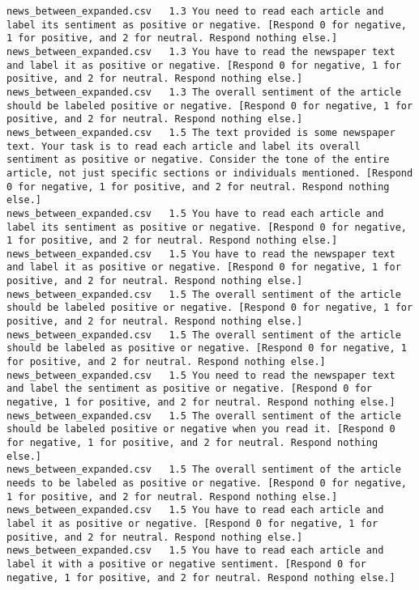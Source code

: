 \begin{lstlisting}[label=lst:promptvariants]
news_between_expanded.csv	1.3	You need to read each article and label its sentiment as positive or negative. [Respond 0 for negative, 1 for positive, and 2 for neutral. Respond nothing else.]
news_between_expanded.csv	1.3	You have to read the newspaper text and label it as positive or negative. [Respond 0 for negative, 1 for positive, and 2 for neutral. Respond nothing else.]
news_between_expanded.csv	1.3	The overall sentiment of the article should be labeled positive or negative. [Respond 0 for negative, 1 for positive, and 2 for neutral. Respond nothing else.]
news_between_expanded.csv	1.5	The text provided is some newspaper text. Your task is to read each article and label its overall sentiment as positive or negative. Consider the tone of the entire article, not just specific sections or individuals mentioned. [Respond 0 for negative, 1 for positive, and 2 for neutral. Respond nothing else.]
news_between_expanded.csv	1.5	You have to read each article and label its sentiment as positive or negative. [Respond 0 for negative, 1 for positive, and 2 for neutral. Respond nothing else.]
news_between_expanded.csv	1.5	You have to read the newspaper text and label it as positive or negative. [Respond 0 for negative, 1 for positive, and 2 for neutral. Respond nothing else.]
news_between_expanded.csv	1.5	The overall sentiment of the article should be labeled positive or negative. [Respond 0 for negative, 1 for positive, and 2 for neutral. Respond nothing else.]
news_between_expanded.csv	1.5	The overall sentiment of the article should be labeled as positive or negative. [Respond 0 for negative, 1 for positive, and 2 for neutral. Respond nothing else.]
news_between_expanded.csv	1.5	You need to read the newspaper text and label the sentiment as positive or negative. [Respond 0 for negative, 1 for positive, and 2 for neutral. Respond nothing else.]
news_between_expanded.csv	1.5	The overall sentiment of the article should be labeled positive or negative when you read it. [Respond 0 for negative, 1 for positive, and 2 for neutral. Respond nothing else.]
news_between_expanded.csv	1.5	The overall sentiment of the article needs to be labeled as positive or negative. [Respond 0 for negative, 1 for positive, and 2 for neutral. Respond nothing else.]
news_between_expanded.csv	1.5	You have to read each article and label it as positive or negative. [Respond 0 for negative, 1 for positive, and 2 for neutral. Respond nothing else.]
news_between_expanded.csv	1.5	You have to read each article and label it with a positive or negative sentiment. [Respond 0 for negative, 1 for positive, and 2 for neutral. Respond nothing else.]

\end{lstlisting}
